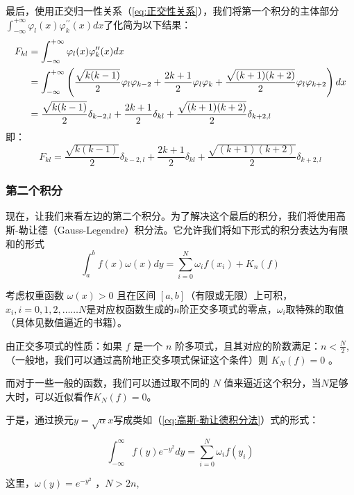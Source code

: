 \documentclass[12pt]{ctexart}
\numberwithin{equation}{section} %
\begin{document}
最后，使用正交归一性关系（\ref{eq:正交性关系}），我们将第一个积分的主体部分$\int_{-\infty}^{+\infty}\varphi_{l}(x)\varphi_{k}^{\prime\prime}(x)dx$了化简为以下结果：
\begin{align}
             F_{kl} &= \int_{-\infty}^{+\infty}\varphi_{l}(x)\varphi_{k}^{\prime\prime}(x)dx \notag \\
             &= \int_{-\infty}^{+\infty}\left(\frac{\sqrt{k(k-1)}}{2}\varphi_{l}\varphi_{k-2}+\frac{2k+1}{2}\varphi_{l}\varphi_{k}+\frac{\sqrt{(k+1)(k+2)}}{2}\varphi_{l}\varphi_{k+2}\right)dx \notag \\
             &= \frac{\sqrt{k(k-1)}}{2}\delta_{k-2,l} + \frac{2k+1}{2}\delta_{kl} + \frac{\sqrt{(k+1)(k+2)}}{2}\delta_{k+2,l}
\end{align}   
即：
\begin{equation}
    \boxed{F_{kl}=\frac{\sqrt{k(k-1)}}{2}\delta_{k-2,l} + \frac{2k+1}{2}\delta_{kl} + \frac{\sqrt{(k+1)(k+2)}}{2}\delta_{k+2,l}}
\label{eq:F矩阵}
\end{equation}
\subsubsection{第二个积分}
现在，让我们来看左边的第二个积分。为了解决这个最后的积分，我们将使用高斯-勒让德（Gauss-Legendre）积分法。它允许我们将如下形式的积分表达为有限和的形式
\begin{equation}
         \int_a^bf(x)\omega(x)dy=\sum_{i=0}^N\omega_if(x_i)+K_n(f)
\label{eq:高斯-勒让德积分法}
        \end{equation}

    考虑权重函数 \( \omega(x) > 0 \) 且在区间 \([a, b]\)（有限或无限）上可积，$x_i,i=0,1,2,……N$是对应权函数生成的$n$阶正交多项式的零点，$\omega_i$取特殊的取值（具体见数值逼近的书籍）。

    由正交多项式的性质：如果 \( f \) 是一个 \( n \) 阶多项式，且其对应的阶数满足：$n<\frac{N}{2}$,（一般地，我们可以通过高阶地正交多项式保证这个条件）则 \( K_N(f) = 0 \) 。

    而对于一些一般的函数，我们可以通过取不同的 \( N \) 值来逼近这个积分，当$N$足够大时，可以近似看作$K_N(f)=0$。
    
于是，通过换元$y=\sqrt{\alpha}x$写成类如（\ref{eq:高斯-勒让德积分法}）式的形式：

\begin{equation}
         \int_{-\infty}^{\infty}f(y)e^{-y^2}dy=\sum_{i=0}^{N}\omega_if(y_i)
\end{equation}

这里，\( \omega(y) = e^{-y^2} \) ，\( N> 2n \),
\end{document}
